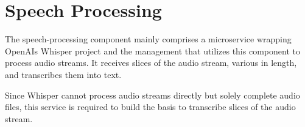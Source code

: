\chapter{Speech Processing}

\label{SpeechProcessing}

The speech-processing component mainly comprises a microservice wrapping OpenAIs Whisper project and the management 
that utilizes this component to process audio streams. It receives slices of the audio stream, various in length, and
transcribes them into text.

Since Whisper cannot process audio streams directly but solely complete audio files, this service is required to build 
the basis to transcribe slices of the audio stream.

